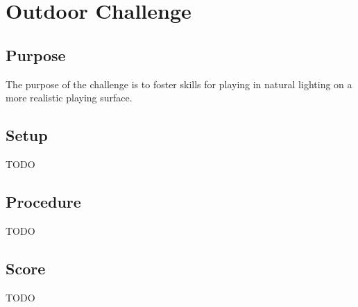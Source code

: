 \documentclass[12pt]{article}
\begin{document}
\newpage



\section{Outdoor Challenge}

\subsection{Purpose}

The purpose of the challenge is to foster skills for playing in natural lighting on a more realistic playing surface.

\subsection{Setup}
TODO

\subsection{Procedure}
TODO 

\subsection{Score}
TODO
\end{document}

